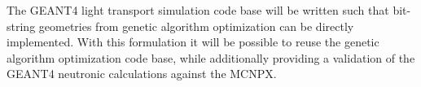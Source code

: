 The GEANT4 light transport simulation code base will be written such that bit-string geometries from genetic algorithm optimization can be directly implemented.
With this formulation it will be possible to reuse the genetic algorithm optimization code base, while additionally providing a validation of the GEANT4 neutronic calculations against the MCNPX.
